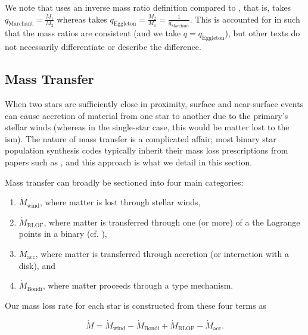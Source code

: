 We note that \citet{Marchant:2016} uses an inverse mass ratio definition compared to \citet{Eggleton:1983}, that is, \citet{Marchant:2016} takes $q_\text{Marchant}=\frac{M_1}{M_2}$ whereas \citet{Eggleton:1983} takes $q_\text{Eggleton}=\frac{M_2}{M_1}=\frac{1}{q_\text{Marchant}}$. This is accounted for in  such that the mass ratios are consistent (and we take $q=q_\text{Eggleton}$), but other texts do not necessarily differentiate or describe the difference.

\subsection{Mass Transfer}\label{sec:mass_transfer}

\alice

When two stars are sufficiently close in proximity, surface and near-surface events can cause accretion of material from one star to another due to the primary's stellar winds (whereas in the single-star case, this would be matter lost to the \gls{ism}). The nature of mass transfer is a complicated affair; most binary star population synthesis codes typically inherit their mass loss prescriptions from papers such as \citet{Bondi:1944, Hurley:2002}, and this approach is what we detail in this section.

Mass transfer can broadly be sectioned into four main categories:

\begin{enumerate}
    \item $\dot{M}_\text{wind}$, where matter is lost through stellar winds,
    \item $\dot{M}_\text{RLOF}$, where matter is transferred through one (or more) of a the Lagrange points in a binary (cf. ),
    \item $\dot{M}_\text{acc}$, where matter is transferred through accretion (or interaction with a disk), and
    \item $\dot{M}_\text{Bondi}$, where matter proceeds through a \citet{Bondi:1944} type mechanism.
\end{enumerate}

Our mass loss rate for each star is constructed from these four terms as

\begin{equation}
    \dot{M} = \dot{M}_{\text{wind}} - \dot{M}_{\text{Bondi}} + \dot{M}_{\text{RLOF}} - \dot{M}_{\text{acc}}.\label{eq:mass_loss_full}
\end{equation}

